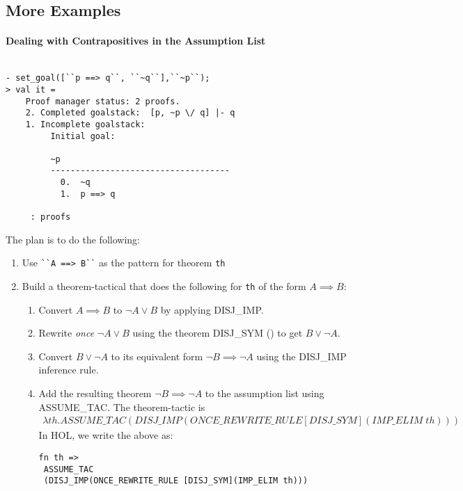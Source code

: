 \subsection{More Examples}

\paragraph*{Dealing with Contrapositives in the Assumption List}

\begin{session}
  \begin{scriptsize}
\begin{verbatim}

- set_goal([``p ==> q``, ``~q``],``~p``);
> val it =
    Proof manager status: 2 proofs.
    2. Completed goalstack:  [p, ~p \/ q] |- q
    1. Incomplete goalstack:
         Initial goal:
         
         ~p
         ------------------------------------
           0.  ~q
           1.  p ==> q
         
     : proofs
\end{verbatim}
  \end{scriptsize}
\end{session}
The plan is to do the following:
\begin{enumerate}
\item Use \verb|``A ==> B``| as the pattern for theorem \texttt{th}
\item Build a theorem-tactical that does the following for \texttt{th}
  of the form $A \implies B$:
  \begin{enumerate}[{a.}]
  \item Convert $A \implies B$ to $\neg A \vee B$ by applying DISJ\_IMP.
  \item Rewrite \emph{once} $\neg A \vee B$ using the theorem
    DISJ\_SYM () to get $B \vee \neg A$.
  \item Convert $B \vee \neg A$ to its equivalent form $\neg B
    \implies \neg A$ using the DISJ\_IMP inference rule.
  \item Add the resulting theorem $\neg B \implies \neg A$ to the
    assumption list using ASSUME\_TAC.  The theorem-tactic is
    \begin{gather*}
      \lambda th.ASSUME\_TAC (DISJ\_IMP(ONCE\_REWRITE\_RULE
      [DISJ\_SYM](IMP\_ELIM \;th)))
    \end{gather*}
    In HOL, we write the above as:
\begin{verbatim}
fn th => 
 ASSUME_TAC 
 (DISJ_IMP(ONCE_REWRITE_RULE [DISJ_SYM](IMP_ELIM th)))
\end{verbatim}

  \end{enumerate}
\end{enumerate}
